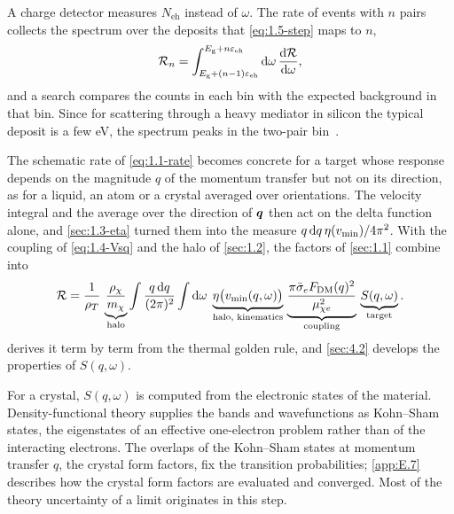 A charge detector measures $N_{\mathrm{eh}}$ instead of $\omega$. The rate of events with $n$ pairs collects the spectrum over the deposits that \cref{eq:1.5-step} maps to $n$,
\begin{equation}
  \mathcal{R}_n = \int_{E_{\mathrm{g}} + (n-1)\varepsilon_{\mathrm{eh}}}^{E_{\mathrm{g}} + n\varepsilon_{\mathrm{eh}}}\mathrm{d}\omega\,\frac{\mathrm{d}\mathcal{R}}{\mathrm{d}\omega} ,
  \label{eq:1.5-bins}
\end{equation}
and a search compares the counts in each bin with the expected background in that bin. Since for scattering through a heavy mediator in silicon the typical deposit is a few eV, the spectrum peaks in the two-pair bin~\cite[Fig.~7]{essig2016direct}.

The schematic rate of \cref{eq:1.1-rate} becomes concrete for a target whose response depends on the magnitude $q$ of the momentum transfer but not on its direction, as for a liquid, an atom or a crystal averaged over orientations. The velocity integral and the average over the direction of $\bm{q}$ then act on the delta function alone, and \cref{sec:1.3-eta} turned them into the measure $q\,\mathrm{d} q\,\eta(v_{\mathrm{min}})/4\pi^2$. With the coupling of \cref{eq:1.4-Vsq} and the halo of \cref{sec:1.2}, the factors of \cref{sec:1.1} combine into~\cite[Eq.~(11)]{kahn2022searches}
\begin{equation}
  \mathcal{R} = \frac{1}{\rho_T}\,\underbrace{\frac{\rho_\chi}{m_\chi}}_{\text{halo}}\int\frac{q\,\mathrm{d} q}{(2\pi)^2}\int\mathrm{d}\omega\;\underbrace{\eta\bigl(v_{\mathrm{min}}(q,\omega)\bigr)}_{\text{halo, kinematics}}\,\underbrace{\frac{\pi\bar{\sigma}_{e}F_{\mathrm{DM}}(q)^2}{\mu_{\chi e}^2}}_{\text{coupling}}\,\underbrace{S(q,\omega)}_{\text{target}}.
  \label{eq:1.5-rate}
\end{equation}
 derives it term by term from the thermal golden rule, and \cref{sec:4.2} develops the properties of $S(q,\omega)$.

For a crystal, $S(q,\omega)$ is computed from the electronic states of the material. Density-functional theory supplies the bands and wavefunctions as Kohn--Sham states, the eigenstates of an effective one-electron problem rather than of the interacting electrons. The overlaps of the Kohn--Sham states at momentum transfer $q$, the crystal form factors, fix the transition probabilities; \cref{app:E.7} describes how the crystal form factors are evaluated and converged. Most of the theory uncertainty of a limit originates in this step.

